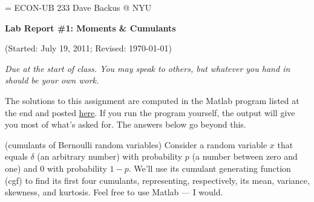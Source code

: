 \documentclass[11pt]{exam}
\begin{document}
\parskip=\bigskipamount
\parindent=0.0in
\thispagestyle{empty}
{\large ECON-UB 233 \hfill Dave Backus @ NYU}

\bigskip\bigskip
\centerline{\Large \bf Lab Report \#1: Moments \& Cumulants}
\centerline{(Started: July 19, 2011; Revised: \today)}

\bigskip
{\it Due at the start of class.
You may speak to others, but whatever you hand in should be your own work.}

\begin{questions}

\begin{solution}
The solutions to this assignment are computed in the Matlab
program listed at the end and posted
\href{http://pages.stern.nyu.edu/~dbackus/233/hw1_s12.m}{here}.
If you run the program yourself,
the output will give you most of what's asked for.
The answers below go beyond this.
\end{solution}

\question (cumulants of Bernoulli random variables)
Consider a random variable $x$ that equals
$\delta$ (an arbitrary number) with probability $p$ (a number between zero and one)
and $0$ with probability $1-p$.
We'll use its cumulant generating function (cgf)
to find its first four cumulants, representing,
respectively, its mean, variance, skewness, and kurtosis.
Feel free to use Matlab --- I would.
%


\end{questions}
\end{document}
